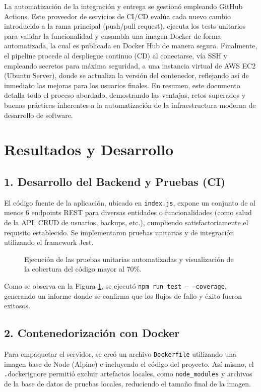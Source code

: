 \documentclass[12pt,a4paper]{article}
\begin{document}
La automatización de la integración y entrega se gestionó empleando GitHub Actions. Este proveedor de servicios de CI/CD evalúa cada nuevo cambio introducido a la rama principal (push/pull request), ejecuta los tests unitarios para validar la funcionalidad y ensambla una imagen Docker de forma automatizada, la cual es publicada en Docker Hub de manera segura. Finalmente, el pipeline procede al despliegue continuo (CD) al conectarse, vía SSH y empleando secretos para máxima seguridad, a una instancia virtual de AWS EC2 (Ubuntu Server), donde se actualiza la versión del contenedor, reflejando así de inmediato las mejoras para los usuarios finales. En resumen, este documento detalla todo el proceso abordado, demostrando las ventajas, retos superados y buenas prácticas inherentes a la automatización de la infraestructura moderna de desarrollo de software.

\newpage

\section*{Resultados y Desarrollo}

\subsection*{1. Desarrollo del Backend y Pruebas (CI)}
El código fuente de la aplicación, ubicado en \texttt{index.js}, expone un conjunto de al menos 6 endpoints REST para diversas entidades o funcionalidades (como salud de la API, CRUD de usuarios, backups, etc.), cumpliendo satisfactoriamente el requisito establecido.
Se implementaron pruebas unitarias y de integración utilizando el framework Jest. 

\begin{figure}[H]
    \centering
    \caption{Ejecución de las pruebas unitarias automatizadas y visualización de la cobertura del código mayor al 70\%.}
    \label{fig:coverage}
\end{figure}

Como se observa en la Figura \ref{fig:coverage}, se ejecutó \texttt{npm run test -- --coverage}, generando un informe donde se confirma que los flujos de fallo y éxito fueron exitosos.

\subsection*{2. Contenedorización con Docker}
Para empaquetar el servidor, se creó un archivo \texttt{Dockerfile} utilizando una imagen base de Node (Alpine) e incluyendo el código del proyecto. Así mismo, el \texttt{.}dockerignore permitió excluir artefactos locales, como \texttt{node\_modules} y archivos de la base de datos de pruebas locales, reduciendo el tamaño final de la imagen.
\end{document}
